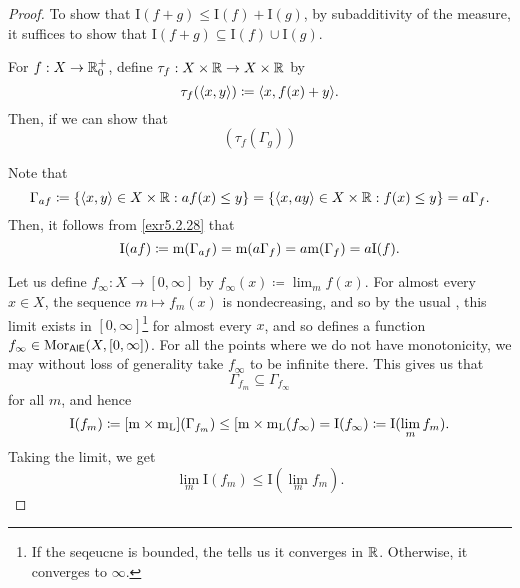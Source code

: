 \begin{thm}[Integral]
\begin{savenotes}
\begin{proof}
To show that $\mathrm{I}(f+g)\leq \mathrm{I}(f)+\mathrm{I}(g)$, by subadditivity of the measure, it suffices to show that $\mathrm{I}(f+g)\subseteq \mathrm{I}(f)\cup \mathrm{I}(g)$.

For $f:X\rightarrow \mathbb{R} _0^+$, define $\tau _f:X\times \mathbb{R} \rightarrow X\times \mathbb{R}$ by
\begin{equation}
\tau _f(\langle x,y\rangle)\coloneqq \langle x,f(x)+y\rangle.
\end{equation}
Then, if we can show that
\begin{equation}
[\meas \times \meas _{\mathrm{L}}](\tau _f(\Gamma _g))
\end{equation}

Note that
\begin{equation}
\Gamma _{af}\coloneqq \left\{ \langle x,y\rangle\in X\times \mathbb{R} :af(x)\leq y\right\} =\left\{ \langle x,ay\rangle\in X\times \mathbb{R} :f(x)\leq y\right\} =a\Gamma _f.
\end{equation}
Then, it follows from \cref{exr5.2.28} that
\begin{equation}
\mathrm{I}(af)\coloneqq \mathrm{m} (\Gamma _{af})=\mathrm{m} (a\Gamma _f)=a\mathrm{m} (\Gamma _f)=a\mathrm{I}(f).
\end{equation}

Let us define $f_\infty :X\rightarrow [0,\infty ]$ by $f_\infty (x)\coloneqq \lim _mf(x)$.  For almost every $x\in X$, the sequence $m\mapsto f_m(x)$ is nondecreasing, and so by the usual , this limit exists in $[0,\infty ]$\footnote{If the seqeucne is bounded, the  tells us it converges in $\mathbb{R}$.  Otherwise, it converges to $\infty$.} for almost every $x$, and so defines a function $f_\infty \in \operatorname{Mor} _{\mathsf{AlE}}(X,[0,\infty ])$.  For all the points where we do not have monotonicity, we may without loss of generality take $f_\infty$ to be infinite there.  This gives us that
\begin{equation}
\Gamma _{f_m}\subseteq \Gamma _{f_\infty}
\end{equation}
for all $m$, and hence
\begin{equation}
\mathrm{I}(f_m)\coloneqq [\mathrm{m} \times \mathrm{m}_{\mathrm{L}}](\Gamma _{f_m})\leq [\mathrm{m} \times \mathrm{m} _{\mathrm{L}}(f_\infty)=\mathrm{I}(f_\infty )\coloneqq \mathrm{I}(\lim _mf_m).
\end{equation}
Taking the limit, we get
\begin{equation}
\lim _m\mathrm{I}(f_m)\leq \mathrm{I}(\lim _mf_m).
\end{equation}


\end{proof}
\end{savenotes}
\end{thm}
